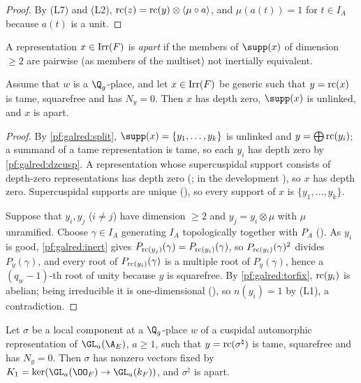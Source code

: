 \begin{proof}
By (L7) and (L2), $\mathrm{rc}(z)=\mathrm{rc}(y)\otimes\langle\mu\circ a\rangle$, and $\mu(a(t))=1$ for $t\in I_A$
because $a(t)$ is a unit.
\end{proof}

A representation $x\in\operatorname{Irr}(F)$ is \emph{apart} if the members of $\supp(x)$ of dimension $\ge2$ are pairwise
(as members of the multiset) not inertially equivalent.

\begin{lemma}\label{pf:galred:mixed}
Assume that $w$ is a $\Q_g$-place, and let $x\in\operatorname{Irr}(F)$ be generic such that $y=\mathrm{rc}(x)$ is tame,
squarefree and has $N_y=0$. Then $x$ has depth zero, $\supp(x)$ is unlinked, and $x$ is apart.
\end{lemma}

\begin{proof}
By \cref{pf:galred:split}, $\supp(x)=\{y_1,\dots,y_k\}$ is unlinked and $y=\bigoplus\mathrm{rc}(y_i)$; a summand of a
tame representation is tame, so each $y_i$ has
depth zero by \cref{pf:galred:dzcusp}. A representation whose supercuspidal support consists of depth-zero
representations has depth zero (\cite{MoyPrasad1996}; in the development
), so $x$ has depth zero. Supercuspidal supports are
unique (), so every support of $x$ is $\{y_1,\dots,y_k\}$.

Suppose that $y_i,y_j$ ($i\ne j$) have dimension $\ge2$ and $y_j=y_i\otimes\mu$ with $\mu$ unramified. Choose
$\gamma\in I_A$ generating $I_A$ topologically together with $P_A$ ().
As $y_i$ is good, \cref{pf:galred:inert} gives $P_{\mathrm{rc}(y_j)}(\gamma)=P_{\mathrm{rc}(y_i)}(\gamma)$, so
$P_{\mathrm{rc}(y_i)}(\gamma)^2$ divides $P_y(\gamma)$, and every root of $P_{\mathrm{rc}(y_i)}(\gamma)$ is a multiple root of
$P_y(\gamma)$, hence a $(q_w-1)$-th root of unity because $y$ is squarefree. By \cref{pf:galred:torfix},
$\mathrm{rc}(y_i)$ is abelian; being irreducible it is one-dimensional (),
so $n(y_i)=1$ by (L1), a contradiction.
\end{proof}

\begin{lemma}\label{pf:galred:guard}
Let $\sigma$ be a local component at a $\Q_g$-place $w$ of a cuspidal automorphic representation of
$\GL_a(\A_E)$, $a\ge1$, such that $y=\mathrm{rc}(\sigma^\natural)$ is tame, squarefree and has $N_y=0$. Then $\sigma$
has nonzero vectors fixed by $K_1=\ker(\GL_a(\OO_F)\to\GL_a(k_F))$, and $\sigma^\natural$ is apart.
\end{lemma}

